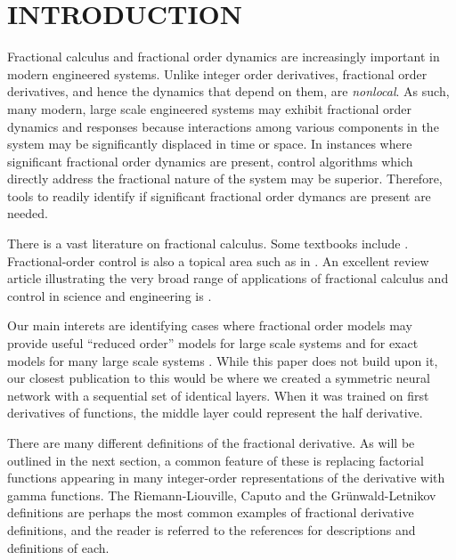 \section{INTRODUCTION}

  Fractional calculus and fractional order dynamics are increasingly important
  in modern engineered systems. Unlike integer order derivatives, fractional
  order derivatives, and hence the dynamics that depend on them, are
  \emph{nonlocal}. As such, many modern, large scale engineered systems may
  exhibit fractional order dynamics and responses because interactions among
  various components in the system may be significantly displaced in time or
  space. In instances where significant fractional order dynamics are present,
  control algorithms which directly address the fractional nature of the system
  may be superior.  Therefore, tools to readily identify if significant
  fractional order dymancs are present are needed.

  There is a vast literature on fractional calculus. Some textbooks include
  \cite{fracbook,fracbook2,oustaloup}.  Fractional-order control is also a
  topical area such as in \cite{fraccontrol,YQChenAcc}. An excellent review
  article illustrating the very broad range of applications of fractional
  calculus and control in science and engineering is \cite{SUN2018213}.


  Our main interets are identifying cases where fractional order models may
  provide useful ``reduced order'' models for large scale systems
  \cite{goodwinemed2023,goodwinemmar2023} and for exact models for many large
  scale systems
  \cite{Goodwine2014Modeling,Leyden2016Using,Leyden2019Large,bg:xnids2022,bg:xninonlinear2020}.
  While this paper does not build upon it, our closest publication to this would
  be \cite{bg:chenSII2022} where we created a symmetric neural network with a
  sequential set of identical layers. When it was trained on first derivatives
  of functions, the middle layer could represent the half derivative. 
 
 There are many different definitions of the fractional derivative. As will be
 outlined in the next section, a common feature of these is replacing factorial
 functions appearing in many integer-order representations of the derivative
 with gamma functions. The Riemann-Liouville, Caputo and the Gr\"unwald-Letnikov
 definitions are perhaps the most common examples of fractional derivative
 definitions, and the reader is referred to the references
 \cite{Machado20111140,4609961,series/lnee/Ortigueira11,das2011functional} for
 descriptions and definitions of each.


